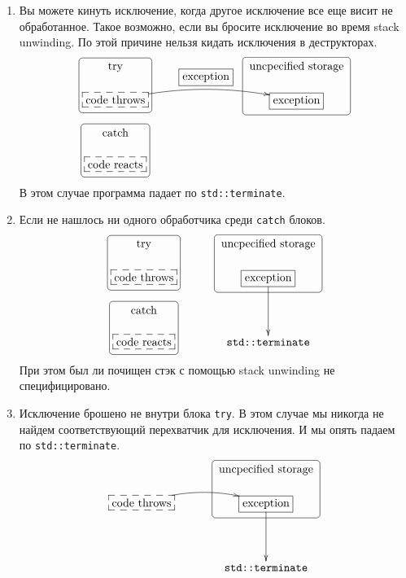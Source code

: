 \begin{enumerate}
\item Вы можете кинуть исключение, когда другое исключение все еще висит не обработанное.
Такое возможно, если вы бросите исключение во время stack unwinding.
По этой причине нельзя кидать исключения в деструкторах.
\[
\xymatrix@R=15pt@C=40pt{
  {\text{try}}
 	{
	\save
   [].[d]*+[F-:<3pt>]\frm{}
   \restore
	}
  &{}&{\text{uncpecified storage}}
   	{
	\save
   [].[d]*+[F-:<3pt>]\frm{}
   \restore
	}
  \\
  {\text{code throws}}\ar@/^10pt/[rr]^{\boxed{\text{exception}}}
       	{
	\save
   [].[]*[F--]\frm{}
   \restore
	}
  &{}&{\text{exception}}%
   	{
	\save
   [].[]*[F-]\frm{}
   \restore
	}
  \\
  {\text{catch}}
   	{
	\save
   [].[d]*+[F-:<3pt>]\frm{}
   \restore
	}
  &{}&{}\\
  {\text{code reacts}}
     	{
	\save
   [].[]*[F--]\frm{}
   \restore
	}
  &{}&{}\\
}
\]
В этом случае программа падает по \verb"std::terminate".

\item Если не нашлось ни одного обработчика среди \verb"catch" блоков.
\[
\xymatrix@R=15pt@C=15pt{
  {\text{try}}
 	{
	\save
   [].[d]*+[F-:<3pt>]\frm{}
   \restore
	}
  &{}&{\text{uncpecified storage}}
   	{
	\save
   [].[d]*+[F-:<3pt>]\frm{}
   \restore
	}
  \\
  {\text{code throws}}
       	{
	\save
   [].[]*[F--]\frm{}
   \restore
	}
  &{}&{\text{exception}}\ar[dd]
   	{
	\save
   [].[]*[F-]\frm{}
   \restore
	}
  \\
  {\text{catch}}
   	{
	\save
   [].[d]*+[F-:<3pt>]\frm{}
   \restore
	}
  &{}&{}\\
  {\text{code reacts}}
     	{
	\save
   [].[]*[F--]\frm{}
   \restore
	}
  &{}&{\texttt{std::terminate}}\\
}
\]
При этом был ли почищен стэк с помощью stack unwinding не специфицировано.

\item Исключение брошено не внутри блока \verb"try".
В этом случае мы никогда не найдем соответствующий перехватчик для исключения.
И мы опять падаем по \verb"std::terminate".
\[
\xymatrix@R=15pt@C=15pt{
  {\phantom{\text{try}}}
  &{}&{\text{uncpecified storage}}
   	{
	\save
   [].[d]*+[F-:<3pt>]\frm{}
   \restore
	}
  \\
  {\text{code throws}}\ar@/^10pt/[rr]
       	{
	\save
   [].[]*[F--]\frm{}
   \restore
	}
  &{}&{\text{exception}}\ar[dd]
   	{
	\save
   [].[]*[F-]\frm{}
   \restore
	}
  \\
  {\phantom{\text{catch}}}
  &{}&{}\\
  {\phantom{\text{code reacts}}}
  &{}&{\texttt{std::terminate}}\\
}
\]
\end{enumerate}

